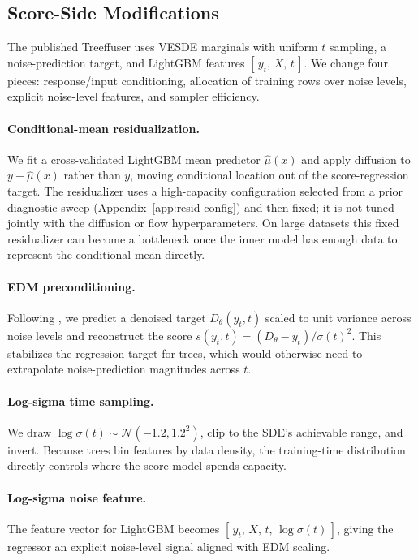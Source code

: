 \documentclass{tpm2026}
\newcommand{\Norm}{\mathcal{N}}
\begin{document}
\subsection{Score-Side Modifications}\label{sec:score-side}
The published Treeffuser uses VESDE marginals with uniform $t$ sampling, a noise-prediction target, and LightGBM features $[\,y_t,\,X,\,t\,]$. We change four pieces: response/input conditioning, allocation of training rows over noise levels, explicit noise-level features, and sampler efficiency.

\paragraph{Conditional-mean residualization.} We fit a cross-validated LightGBM mean predictor $\hat{\mu}(x)$ and apply diffusion to $y - \hat{\mu}(x)$ rather than $y$, moving conditional location out of the score-regression target. The residualizer uses a high-capacity configuration selected from a prior diagnostic sweep (Appendix~\ref{app:resid-config}) and then fixed; it is not tuned jointly with the diffusion or flow hyperparameters. On large datasets this fixed residualizer can become a bottleneck once the inner model has enough data to represent the conditional mean directly.

\paragraph{EDM preconditioning.} Following \citet{karras2022edm}, we predict a denoised target $D_\theta(y_t, t)$ scaled to unit variance across noise levels and reconstruct the score $s(y_t, t) = (D_\theta - y_t)/\sigma(t)^2$. This stabilizes the regression target for trees, which would otherwise need to extrapolate noise-prediction magnitudes across $t$.

\paragraph{Log-sigma time sampling.} We draw $\log\sigma(t) \sim \Norm(-1.2, 1.2^2)$, clip to the SDE's achievable range, and invert. Because trees bin features by data density, the training-time distribution directly controls where the score model spends capacity.

\paragraph{Log-sigma noise feature.} The feature vector for LightGBM becomes $[\,y_t,\,X,\,t,\,\log\sigma(t)\,]$, giving the regressor an explicit noise-level signal aligned with EDM scaling.
\end{document}
